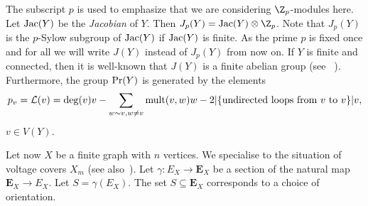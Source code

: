 The subscript $p$ is used to emphasize that we are considering $\Z_p$-modules here. Let $\textup{Jac}(Y)$ be the \emph{Jacobian} of $Y$. Then $J_p(Y)=\textup{Jac}(Y)\otimes \Z_p$. Note that $J_p(Y)$ is the $p$-Sylow subgroup of $\textup{Jac}(Y)$ if $\textup{Jac}(Y)$ is finite. As the prime $p$ is fixed once and for all we will write $J(Y)$ instead of $J_p(Y)$ from now on. If $Y$ is finite and connected, then it is well-known that $J(Y)$ is a finite abelian group (see ~\cite[Proposition 2.37]{corry-Perkinson}). Furthermore, the group $\textup{Pr}(Y)$ is generated by the elements
\[p_v= \mathcal{L}(v) = \deg(v)v-\sum_{w\sim v, w\neq v}\textup{mult}(v,w)w-2\vert \{\textup{undirected loops from $v$ to $v$}\}\vert v, \] 
$v \in V(Y)$. 

Let now $X$ be a finite graph with $n$ vertices. We specialise to the situation of voltage covers $X_m$ (see also~\cite{diss-gonet}). 
Let $\gamma\colon E_X\longrightarrow\mathbf{E}_X$ be a section of the natural map $\mathbf{E}_X\longrightarrow E_X$. Let ${S=\gamma(E_X)}$. The set ${S \subseteq \mathbf{E}_X}$ corresponds to a choice of orientation. 

